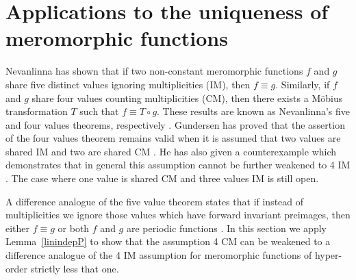 \documentclass{amsart}
\theoremstyle{definition}
\numberwithin{equation}{section}
\numberwithin{theorem}{section}
\begin{document}
\section{Applications to the uniqueness of meromorphic
functions}\label{uniquenesssec}

Nevanlinna has shown that if two non-constant meromorphic functions $f$ and $g$
share five distinct values ignoring multiplicities (IM), then $f\equiv g$.
Similarly, if $f$ and $g$ share four values counting
multiplicities (CM), then there exists a M\"obius transformation $T$ such that $f\equiv T\circ g$.
These results are known as Nevanlinna's five and four values theorems,
respectively \cite{nevanlinna:29}. Gundersen has proved that the assertion of the four values theorem remains valid when
it is assumed that two values are shared IM and two are shared CM \cite{gundersen:83}. He has also given a counterexample
which demonstrates that in general this assumption cannot be further weakened to 4 IM \cite{gundersen:79}. The case where one value is shared CM and three values IM is still open.

A difference analogue of the five value theorem states that if instead of multiplicities we ignore those
values which have forward invariant preimages, then either $f\equiv g$ or both $f$ and $g$ are periodic
functions \cite{halburdk:06AASFM}. In this section we apply Lemma~\ref{linindepP} to show that the assumption 4 CM can be weakened to a difference analogue of the  4 IM assumption for meromorphic functions of hyper-order strictly less that one.
\end{document}
